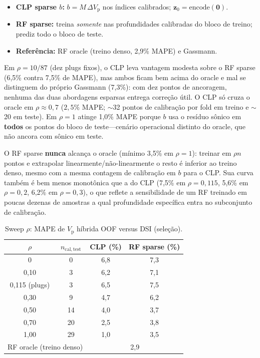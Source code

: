\documentclass[11pt,a4paper]{article}
\numberwithin{equation}{section}
\newcommand{\Vp}{\ensuremath{V_{\mathrm{p}}}}
\begin{document}
\begin{itemize}
  \item \textbf{CLP sparse $b$:} $b = M\,\Delta V_{\mathrm{p}}$ nos índices
        calibrados; $\mathbf{z}_0 = \mathrm{encode}(\mathbf{0})$.
  \item \textbf{RF sparse:} treina \emph{somente} nas profundidades
        calibradas do bloco de treino; prediz todo o bloco de teste.
  \item \textbf{Referência:} RF oracle (treino denso, 2,9\% MAPE) e Gassmann.
\end{itemize}

Em $\rho=10/87$ (dez plugs fixos), o CLP leva vantagem modesta sobre o RF
sparse (6,5\% contra 7,5\% de MAPE), mas ambos ficam bem acima do oracle e
mal se distinguem do próprio Gassmann (7,3\%): com dez pontos de ancoragem,
nenhuma das duas abordagens esparsas entrega correção útil.
O CLP só cruza o oracle em $\rho \approx 0{,}7$
($2{,}5\%$ MAPE; $\sim$32 pontos de calibração por fold em treino
e $\sim$20 em teste).
Em $\rho=1$ atinge 1,0\% MAPE porque $b$ usa o
resíduo sônico em \textbf{todos} os pontos do bloco de teste---cenário
operacional distinto do oracle, que não ancora com sônico em teste.

O RF sparse \textbf{nunca} alcança o oracle (mínimo 3,5\% em $\rho=1$):
treinar em $\rho n$ pontos e extrapolar linearmente/não-linearmente o resto
é inferior ao treino denso, mesmo com a mesma contagem de calibração em $b$
para o CLP.
Sua curva também é bem menos monotônica que a do CLP (7,5\% em
$\rho=0{,}115$, 5,6\% em $\rho=0{,}2$, 6,2\% em $\rho=0{,}3$), o que reflete a
sensibilidade de um RF treinado em poucas dezenas de amostras a qual
profundidade específica entra no subconjunto de calibração.

\begin{table}[H]
  \centering
  \caption{Sweep $\rho$: MAPE de \Vp{} híbrida OOF versus DSI (seleção).}
  \label{tab:rho_sweep}
  \small
  \begin{tabular}{cccc}
    \toprule
    $\rho$ & $n_{\mathrm{cal,test}}$ & CLP (\%) & RF sparse (\%) \\
    \midrule
    0 & 0 & 6,8 & 7,3 \\
    0,10 & 3 & 6,2 & 7,1 \\
    0,115 (plugs) & 3 & 6,5 & 7,5 \\
    0,30 & 9 & 4,7 & 6,2 \\
    0,50 & 14 & 4,0 & 3,7 \\
    0,70 & 20 & 2,5 & 3,8 \\
    1,00 & 29 & 1,0 & 3,5 \\
    \midrule
    \multicolumn{2}{l}{RF oracle (treino denso)} & \multicolumn{2}{c}{2,9} \\
    \bottomrule
  \end{tabular}
\end{table}
\end{document}
